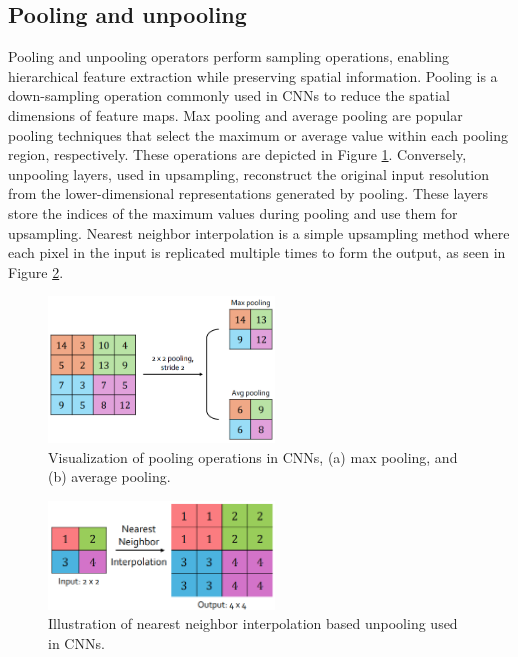 \subsection{Pooling and unpooling} Pooling and unpooling operators perform sampling operations, enabling hierarchical feature extraction while preserving spatial information. Pooling is a down-sampling operation commonly used in CNNs to reduce the spatial dimensions of feature maps. Max pooling and average pooling are popular pooling techniques that select the maximum or average value within each pooling region, respectively. These operations are depicted in Figure \ref{fig:Pool}. Conversely, unpooling layers, used in upsampling, reconstruct the original input resolution from the lower-dimensional representations generated by pooling. These layers store the indices of the maximum values during pooling and use them for upsampling. Nearest neighbor interpolation is a simple upsampling method where each pixel in the input is replicated multiple times to form the output, as seen in Figure \ref{fig:Unpool2}.
\begin{figure}[ht]
    \centering
    \includegraphics[width=6cm]{images/Theory-DL/Pool.png}
    \caption{Visualization of pooling operations in CNNs, (a) max pooling, and (b) average pooling.}
    \label{fig:Pool}
\end{figure}
\begin{figure}[ht]
        \centering
        \includegraphics[width=6cm]{images/Theory-DL/NNUnpool.png}
        \caption{Illustration of nearest neighbor interpolation based unpooling used in CNNs.}
        \label{fig:Unpool2}
    \end{figure}

